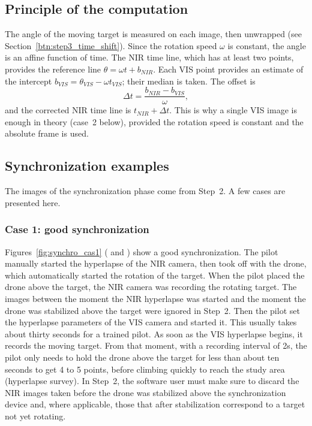 \documentclass[a4paper,11pt]{report}
\begin{document}
\subsection{Principle of the computation}
The angle of the moving target is measured on each image, then unwrapped (see Section~\ref{btn:step3_time_shift}). Since the rotation speed $\omega$ is constant, the angle is an affine function of time. The NIR time line, which has at least two points, provides the reference line $\theta = \omega t + b_{NIR}$. Each VIS point provides an estimate of the intercept $b_{VIS} = \theta_{VIS} - \omega t_{VIS}$; their median is taken. The offset is
\begin{equation}
  \Delta t = \frac{b_{NIR} - b_{VIS}}{\omega},
\end{equation}
and the corrected NIR time line is $t_{NIR} + \Delta t$. This is why a single VIS image is enough in theory (case~2 below), provided the rotation speed is constant and the absolute frame is used.

\subsection{Synchronization examples}\label{sec:step3_examples}
The images of the synchronization phase come from Step~2. A few cases are presented here.

\subsubsection{Case 1: good synchronization}
Figures~\ref{fig:synchro_cas1} ( and ) show a good synchronization. The pilot manually started the hyperlapse of the NIR camera, then took off with the drone, which automatically started the rotation of the target. When the pilot placed the drone above the target, the NIR camera was recording the rotating target. The images between the moment the NIR hyperlapse was started and the moment the drone was stabilized above the target were ignored in Step~2. Then the pilot set the hyperlapse parameters of the VIS camera and started it. This usually takes about thirty seconds for a trained pilot. As soon as the VIS hyperlapse begins, it records the moving target. From that moment, with a recording interval of 2s, the pilot only needs to hold the drone above the target for less than about ten seconds to get 4 to 5 points, before climbing quickly to reach the study area (hyperlapse survey). In Step~2, the software user must make sure to discard the NIR images taken before the drone was stabilized above the synchronization device and, where applicable, those that after stabilization correspond to a target not yet rotating.
\end{document}
